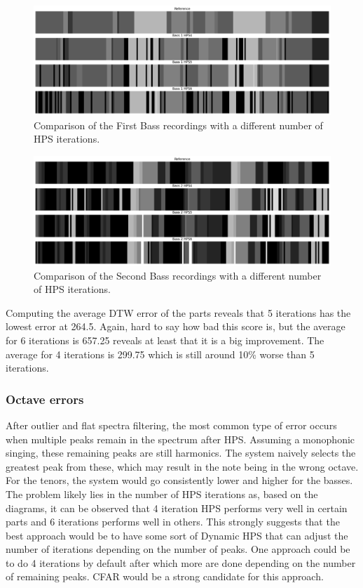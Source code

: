 \begin{figure}[ht]
    \centering
    \includegraphics[width=\textwidth]{./images/hpsBass1.png}
    \caption{Comparison of the First Bass recordings with a different number of HPS iterations. \label{fig:hpsBass1}}
\end{figure}


\begin{figure}[ht]
    \centering
    \includegraphics[width=\textwidth]{./images/hpsBass2.png}
    \caption{Comparison of the Second Bass recordings with a different number of HPS iterations. \label{fig:hpsBass2}}
\end{figure}

Computing the average DTW error of the parts reveals that 5 iterations has the lowest error at 264.5. Again, hard to say how bad this score is, but the average for 6 iterations is 657.25 reveals at least that it is a big improvement. The average for 4 iterations is 299.75 which is still around 10\% worse than 5 iterations.

\subsubsection{Octave errors}
After outlier and flat spectra filtering, the most common type of error occurs when multiple peaks remain in the spectrum after HPS. Assuming a monophonic singing, these remaining peaks are still harmonics. The system naively selects the greatest peak from these, which may result in the note being in the wrong octave. For the tenors, the system would go consistently lower and higher for the basses. The problem likely lies in the number of HPS iterations as, based on the diagrams, it can be observed that 4 iteration HPS performs very well in certain parts and 6 iterations performs well in others. This strongly suggests that the best approach would be to have some sort of Dynamic HPS that can adjust the number of iterations depending on the number of peaks. One approach could be to do 4 iterations by default after which more are done depending on the number of remaining peaks. CFAR would be a strong candidate for this approach.

